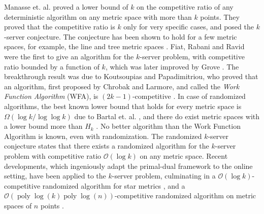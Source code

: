 \documentclass[11pt]{article}
\theoremstyle{plain}\newtheorem{theorem}{Theorem}
\theoremstyle{definition}
\theoremstyle{remark}
\DeclareMathOperator{\poly}{poly}
\begin{document}
Manasse et. al. \cite{ManasseMS88} proved a lower bound of $k$ on the competitive ratio of any deterministic algorithm on any metric space with more than $k$ points. They proved that the competitive ratio is $k$ only for very specific cases, and posed the $k$-server conjecture.
The conjecture has been shown to hold for a few metric spaces, for example, the line \cite{ChrobakKPV91} and tree metric spaces \cite{ChrobakL91}.
Fiat, Rabani and Ravid \cite{FiatRR90} were the first to give an algorithm for the $k$-server problem, with competitive ratio bounded by a function of $k$, which was later improved by Grove \cite{Grove91,BartalG00}. The breakthrough result was due to Koutsoupias and Papadimitriou, who proved that an algorithm, first proposed by Chrobak and Larmore, and called the \textit{Work Function Algorithm} (WFA), is $(2k-1)$-competitive \cite{KoutsoupiasP95}.
In case of randomized algorithms, the best known lower bound that holds for every metric space is $\Omega(\log k/\log\log k)$ due to Bartal et. al. \cite{BartalBM01}, and there do exist metric spaces with a lower bound more than $H_k$ \cite{KarlinMMO94}. No better algorithm than the Work Function Algorithm is known, even with randomization. The randomized $k$-server conjecture states that there exists a randomized algorithm for the $k$-server problem with competitive ratio $\mathcal{O}(\log k)$ on any metric space. 
Recent developments, which ingeniously adapt the primal-dual framework to the online setting, have been applied to the $k$-server problem, culminating in a $\mathcal{O}(\log k)$-competitive randomized algorithm for star metrics \cite{BansalBN07}, and a $\mathcal{O}(\poly\log(k)\poly\log(n))$-competitive randomized algorithm on metric spaces of $n$ points \cite{BansalBMN11}.
\end{document}
